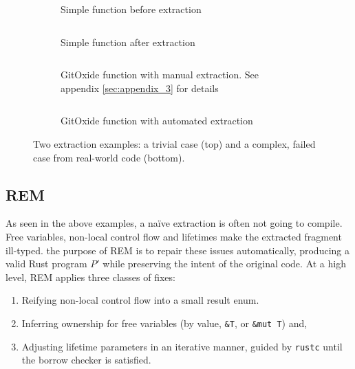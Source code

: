 \begin{figure}[h]
\centering
\begin{subfigure}{0.45\linewidth}
  \inputminted[fontsize=\footnotesize, frame=none, linenos=false, breaklines=true, breakanywhere=true]{rust}{3_Chapter3/simple_original.rs}
  \caption{Simple function before extraction}
\end{subfigure}
\hfill
\begin{subfigure}{0.45\linewidth}
  \inputminted[fontsize=\footnotesize, frame=none, linenos=false, breaklines=true, breakanywhere=true]{rust}{3_Chapter3/simple_extracted.rs}
  \caption{Simple function after extraction}
\end{subfigure}

\vspace{1em}

\begin{subfigure}{0.45\linewidth}
  \inputminted[fontsize=\footnotesize, frame=none, linenos=false, breaklines=true, breakanywhere=true]{rust}{3_Chapter3/complex_original.rs}
  \caption{GitOxide function with manual extraction. See appendix \ref{sec:appendix_3} for details}
\end{subfigure}
\hfill
\begin{subfigure}{0.45\linewidth}
  \inputminted[fontsize=\footnotesize, frame=none, linenos=false, breaklines=true, breakanywhere=true]{rust}{3_Chapter3/complex_extracted.rs}
  \caption{GitOxide function with automated extraction}
  \label{content:bad_gitoxide_extraction}
\end{subfigure}

\caption{Two extraction examples: a trivial case (top) and a complex, failed case from real-world code (bottom).}
\label{fig:extraction_examples}
\end{figure}

\subsection{REM}

As seen in the above examples, a na\"ive extraction is often not going to
compile. Free variables, non-local control flow and lifetimes make the extracted
fragment ill-typed. the purpose of REM is to repair these issues automatically,
producing a valid Rust program $P'$ while preserving the intent of the original
code. At a high level, REM applies three classes of fixes:

\begin{enumerate}[label=(\roman*)]
    \item Reifying non-local control flow into a small result enum.
    \item Inferring ownership for free variables (by value, \verb|&T|, or
    \verb|&mut T|) and,
    \item Adjusting lifetime parameters in an iterative manner, guided by
    \verb|rustc| until the borrow checker is satisfied.
\end{enumerate}

